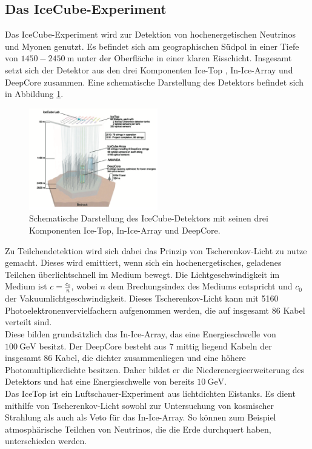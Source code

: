\subsection{Das IceCube-Experiment}
Das IceCube-Experiment wird zur Detektion von hochenergetischen Neutrinos und Myonen genutzt. Es befindet sich am geographischen Südpol in einer Tiefe von $1450-\SI{2450}{\meter}$ unter der Oberfläche in einer klaren Eisschicht. Insgesamt setzt sich der Detektor aus den drei Komponenten Ice-Top \cite{3246225}, In-Ice-Array \cite{ACHTERBERG2006155} und DeepCore \cite{2143409} zusammen. Eine schematische Darstellung des Detektors befindet sich in Abbildung \ref{fig:Ice}.
\begin{figure}
  \centering
  \includegraphics[width=0.5\textwidth]{graphics/IceCube.png}
  \caption{Schematische Darstellung des IceCube-Detektors mit seinen drei Komponenten Ice-Top, In-Ice-Array und DeepCore.\cite{IceCube}}
  \label{fig:Ice}
\end{figure}
Zu Teilchendetektion wird sich dabei das Prinzip von Tscherenkov-Licht zu nutze gemacht. Dieses wird emittiert, wenn sich ein hochenergetisches, geladenes Teilchen überlichtschnell im Medium bewegt. Die Lichtgeschwindigkeit im Medium ist $c=\frac{c_{0}}{n}$, wobei $n$ dem Brechungsindex des Mediums entspricht und $c_{0}$ der Vakuumlichtgeschwindigkeit. Dieses Tscherenkov-Licht kann mit 5160 Photoelektronenvervielfachern aufgenommen werden, die auf insgesamt 86 Kabel verteilt sind.\\
Diese bilden grundsätzlich das In-Ice-Array, das eine Energieschwelle von $\SI{100}{\giga\electronvolt}$ besitzt. Der DeepCore besteht aus 7 mittig liegend Kabeln der insgesamt 86 Kabel, die dichter zusammenliegen und eine höhere Photomultiplierdichte besitzen. Daher bildet er die Niederenergieerweiterung des Detektors und hat eine Energieschwelle von bereits $\SI{10}{\giga\electronvolt}$.\\
Das IceTop ist ein Luftschauer-Experiment aus lichtdichten Eistanks. Es dient mithilfe von Tscherenkov-Licht sowohl zur Untersuchung von kosmischer Strahlung als auch als Veto für das In-Ice-Array. So können zum Beispiel atmosphärische Teilchen von Neutrinos, die die Erde durchquert haben, unterschieden werden.\\
